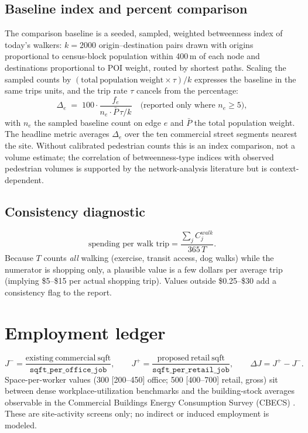 \documentclass[11pt]{article}
\newcommand{\assum}[1]{\texttt{#1}}
\begin{document}
\subsection{Baseline index and percent comparison}
The comparison baseline is a seeded, sampled, weighted betweenness index
\cite{freeman1977, brandes2001} of today's walkers: $k = 2000$
origin--destination pairs drawn with origins proportional to census-block
population within 400\,m of each node and destinations proportional to POI
weight, routed by shortest paths. Scaling the sampled counts by
$(\mathrm{total\ population\ weight} \times \tau) / k$ expresses the baseline
in the same trips units, and the trip rate $\tau$ cancels from the percentage:
\begin{equation}
\Delta_e \;=\; 100 \cdot
\frac{f_e}{n_e \cdot \bar{P}\, \tau / k}
\quad \text{(reported only where } n_e \geq 5\text{)},
\end{equation}
with $n_e$ the sampled baseline count on edge $e$ and $\bar{P}$ the total
population weight. The headline metric averages $\Delta_e$ over the ten
commercial street segments nearest the site. Without calibrated pedestrian
counts this is an index comparison, not a volume estimate; the correlation of
betweenness-type indices with observed pedestrian volumes is supported by the
network-analysis literature but is context-dependent.

\subsection{Consistency diagnostic}
\begin{equation}
\text{spending per walk trip} = \frac{\sum_j C^{walk}_j}{365\, T}.
\end{equation}
Because $T$ counts \emph{all} walking (exercise, transit access, dog walks)
while the numerator is shopping only, a plausible value is a few dollars per
average trip (implying \$5--\$15 per actual shopping trip). Values outside
\$0.25--\$30 add a consistency flag to the report.

\section{Employment ledger}

\begin{equation}
J^- = \frac{\mathrm{existing\ commercial\ sqft}}{\assum{sqft\_per\_office\_job}},
\qquad
J^+ = \frac{\mathrm{proposed\ retail\ sqft}}{\assum{sqft\_per\_retail\_job}},
\qquad
\Delta J = J^+ - J^-.
\end{equation}
Space-per-worker values (300 [200--450] office; 500 [400--700] retail, gross)
sit between dense workplace-utilization benchmarks and the building-stock
averages observable in the Commercial Buildings Energy Consumption Survey
(CBECS) \cite{cbecs}. These are site-activity screens
only; no indirect or induced employment is modeled.
\end{document}
